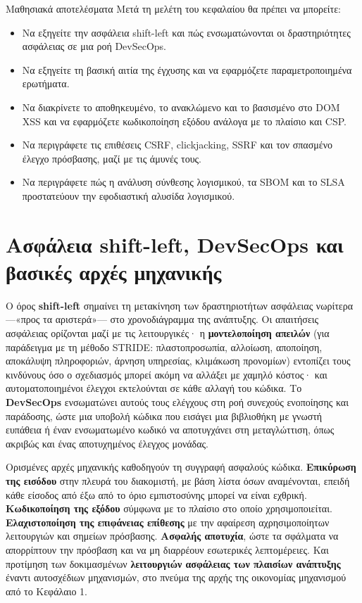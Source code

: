 \documentclass[11pt,openany]{book}
\begin{document}
\begin{outcomesbox}{Μαθησιακά αποτελέσματα}
Μετά τη μελέτη του κεφαλαίου θα πρέπει να μπορείτε:
\begin{itemize}
  \item Να εξηγείτε την ασφάλεια shift-left και πώς ενσωματώνονται οι δραστηριότητες ασφάλειας σε μια ροή DevSecOps.
  \item Να εξηγείτε τη βασική αιτία της έγχυσης και να εφαρμόζετε παραμετροποιημένα ερωτήματα.
  \item Να διακρίνετε το αποθηκευμένο, το ανακλώμενο και το βασισμένο στο DOM XSS και να εφαρμόζετε κωδικοποίηση εξόδου ανάλογα με το πλαίσιο και CSP.
  \item Να περιγράφετε τις επιθέσεις CSRF, clickjacking, SSRF και τον σπασμένο έλεγχο πρόσβασης, μαζί με τις άμυνές τους.
  \item Να περιγράφετε πώς η ανάλυση σύνθεσης λογισμικού, τα SBOM και το SLSA προστατεύουν την εφοδιαστική αλυσίδα λογισμικού.
\end{itemize}
\end{outcomesbox}

\section{Ασφάλεια shift-left, DevSecOps και βασικές αρχές μηχανικής}\label{sec:9.1}
Ο όρος \textbf{shift-left} σημαίνει τη μετακίνηση των δραστηριοτήτων ασφάλειας νωρίτερα —«προς τα αριστερά»— στο χρονοδιάγραμμα της ανάπτυξης. Οι απαιτήσεις ασφάλειας ορίζονται μαζί με τις λειτουργικές· η \textbf{μοντελοποίηση απειλών} (για παράδειγμα με τη μέθοδο STRIDE: πλαστοπροσωπία, αλλοίωση, αποποίηση, αποκάλυψη πληροφοριών, άρνηση υπηρεσίας, κλιμάκωση προνομίων) εντοπίζει τους κινδύνους όσο ο σχεδιασμός μπορεί ακόμη να αλλάξει με χαμηλό κόστος· και αυτοματοποιημένοι έλεγχοι εκτελούνται σε κάθε αλλαγή του κώδικα. Το \textbf{DevSecOps} ενσωματώνει αυτούς τους ελέγχους στη ροή συνεχούς ενοποίησης και παράδοσης, ώστε μια υποβολή κώδικα που εισάγει μια βιβλιοθήκη με γνωστή ευπάθεια ή έναν ενσωματωμένο κωδικό να αποτυγχάνει στη μεταγλώττιση, όπως ακριβώς και ένας αποτυχημένος έλεγχος μονάδας.

Ορισμένες αρχές μηχανικής καθοδηγούν τη συγγραφή ασφαλούς κώδικα. \textbf{Επικύρωση της εισόδου} στην πλευρά του διακομιστή, με βάση λίστα όσων αναμένονται, επειδή κάθε είσοδος από έξω από το όριο εμπιστοσύνης μπορεί να είναι εχθρική. \textbf{Κωδικοποίηση της εξόδου} σύμφωνα με το πλαίσιο στο οποίο χρησιμοποιείται. \textbf{Ελαχιστοποίηση της επιφάνειας επίθεσης} με την αφαίρεση αχρησιμοποίητων λειτουργιών και σημείων πρόσβασης. \textbf{Ασφαλής αποτυχία}, ώστε τα σφάλματα να απορρίπτουν την πρόσβαση και να μη διαρρέουν εσωτερικές λεπτομέρειες. Και προτίμηση των δοκιμασμένων \textbf{λειτουργιών ασφάλειας των πλαισίων ανάπτυξης} έναντι αυτοσχέδιων μηχανισμών, στο πνεύμα της αρχής της οικονομίας μηχανισμού από το Κεφάλαιο 1.
\end{document}
